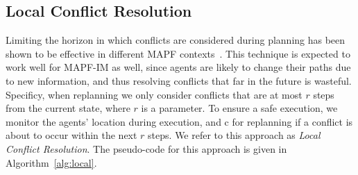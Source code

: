\documentclass[letterpaper]{article} %
\def\
UrlFont{\rm}  %
\theoremstyle{definition}
\begin{document}
\subsection{Local Conflict Resolution}
\label{scn:local}
Limiting the horizon in which conflicts are considered during planning has been shown to be effective in different MAPF contexts~\cite{silver2005cooperative,li2021lifelong}. This technique is expected to work well for MAPF-IM as well, since agents are likely to change their paths due to new information, and thus resolving conflicts that far in the future is wasteful. Specificy, when replanning we only consider conflicts that are at most $r$ steps from the current state, where $r$ is a parameter. To ensure a safe execution, we monitor the agents' location during execution, and c for replanning if a conflict is about to occur within the next $r$ steps.
We refer to this approach as \emph{Local Conflict Resolution}. The pseudo-code for this approach is given in Algorithm~\ref{alg:local}. %


\end{document}
